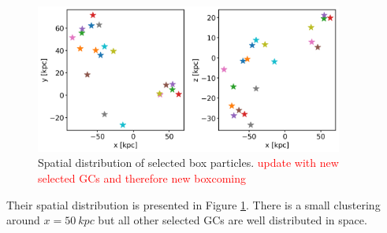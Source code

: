 \begin{figure}[htbp]
\captionsetup{format=plain}
    \centering
    \includegraphics[width=0.9\textwidth]{plots/Dynamics/dist/progenitor2_box_distribution.png}
    \caption{Spatial distribution of selected box particles. \textcolor{red}{update with new selected GCs and therefore new boxcoming}}
    \label{fig:box_GCs_distr}
\end{figure}

Their spatial distribution is presented in Figure \ref{fig:box_GCs_distr}. There is a small clustering around $x = \SI{50}{kpc}$ but all other selected GCs are well distributed in space. 

